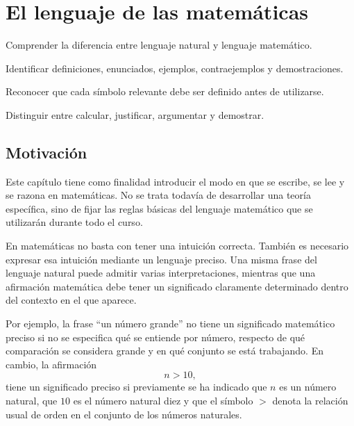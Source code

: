 
\chapter{El lenguaje de las matemáticas}
\label{chap:lenguaje-matematicas}

\begin{objetivos}
  \item Comprender la diferencia entre lenguaje natural y lenguaje matemático.
  \item Identificar definiciones, enunciados, ejemplos, contraejemplos y demostraciones.
  \item Reconocer que cada símbolo relevante debe ser definido antes de utilizarse.
  \item Distinguir entre calcular, justificar, argumentar y demostrar.
\end{objetivos}

\section{Motivación}
\label{sec:motivacion-lenguaje}

Este capítulo tiene como finalidad introducir el modo en que se escribe, se lee y se razona en matemáticas. No se trata todavía de desarrollar una teoría específica, sino de fijar las reglas básicas del lenguaje matemático que se utilizarán durante todo el curso.

En matemáticas no basta con tener una intuición correcta. También es necesario expresar esa intuición mediante un lenguaje preciso. Una misma frase del lenguaje natural puede admitir varias interpretaciones, mientras que una afirmación matemática debe tener un significado claramente determinado dentro del contexto en el que aparece.

Por ejemplo, la frase ``un número grande'' no tiene un significado matemático preciso si no se especifica qué se entiende por número, respecto de qué comparación se considera grande y en qué conjunto se está trabajando. En cambio, la afirmación
\[
  n > 10,
\]
tiene un significado preciso si previamente se ha indicado que \(n\) es un número natural, que \(10\) es el número natural diez y que el símbolo \(>\) denota la relación usual de orden en el conjunto de los números naturales.

